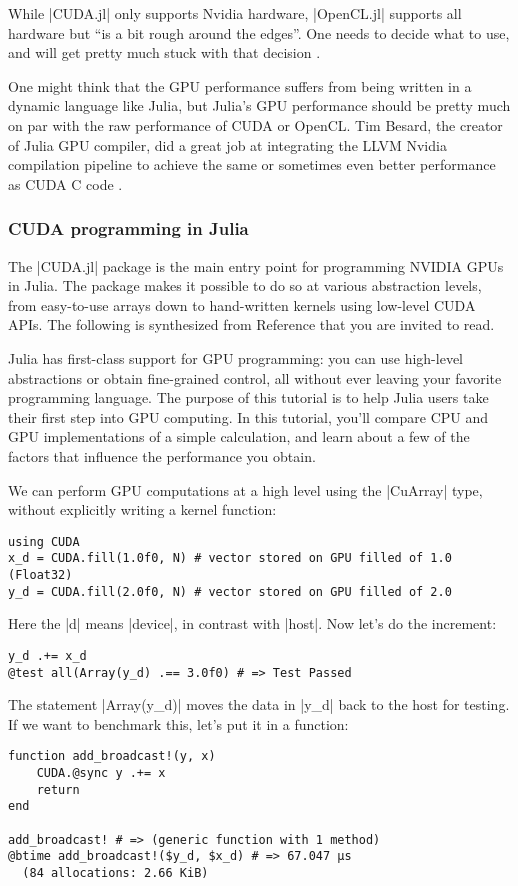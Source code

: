 While |CUDA.jl| only supports Nvidia hardware, |OpenCL.jl| supports all hardware but “is a bit rough around the edges”. One needs to decide what to use, and will get pretty much stuck with that decision \cite{JuliaGPU}.

One might think that the GPU performance suffers from being written in a dynamic language like Julia, but Julia's GPU performance should be pretty much on par with the raw performance of CUDA or OpenCL. Tim Besard, the creator of Julia GPU compiler, did a great job at integrating the LLVM Nvidia compilation pipeline to achieve the same or sometimes even better performance as CUDA C code \cite{JuliaGPU}. 


\subsubsection*{CUDA programming in Julia}

The |CUDA.jl| package is the main entry point for programming NVIDIA GPUs in Julia. The package makes it possible to do so at various abstraction levels, from easy-to-use arrays down to hand-written kernels using low-level CUDA APIs. The following is synthesized from Reference \cite{JuliaGPU:gentle} that you are invited to read.

Julia has first-class support for GPU programming: you can use high-level abstractions or obtain fine-grained control, all without ever leaving your favorite programming language. The purpose of this tutorial is to help Julia users take their first step into GPU computing. In this tutorial, you'll compare CPU and GPU implementations of a simple calculation, and learn about a few of the factors that influence the performance you obtain.

We can perform GPU computations at a high level using the |CuArray| type, without explicitly writing a kernel function:
\begin{lstlisting}[language=JuliaLocal, style=julia, mathescape=false]
using CUDA
x_d = CUDA.fill(1.0f0, N) # vector stored on GPU filled of 1.0 (Float32)
y_d = CUDA.fill(2.0f0, N) # vector stored on GPU filled of 2.0
\end{lstlisting}
Here the |d| means |device|, in contrast with |host|. Now let's do the increment:
\begin{lstlisting}[language=JuliaLocal, style=julia, mathescape=false]
y_d .+= x_d
@test all(Array(y_d) .== 3.0f0) # => Test Passed
\end{lstlisting}


The statement |Array(y_d)| moves the data in |y_d| back to the host for testing. If we want to benchmark this, let's put it in a function:
\begin{lstlisting}[language=JuliaLocal, style=julia, mathescape=false]
function add_broadcast!(y, x)
    CUDA.@sync y .+= x
    return
end

add_broadcast! # => (generic function with 1 method)
@btime add_broadcast!($y_d, $x_d) # => 67.047 μs 
  (84 allocations: 2.66 KiB)
\end{lstlisting}

